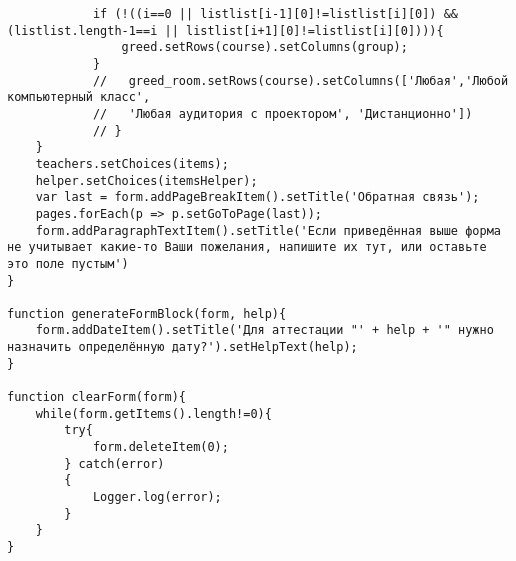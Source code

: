 \begin{lstlisting}
			if (!((i==0 || listlist[i-1][0]!=listlist[i][0]) && (listlist.length-1==i || listlist[i+1][0]!=listlist[i][0]))){
				greed.setRows(course).setColumns(group);
			}
			//   greed_room.setRows(course).setColumns(['Любая','Любой компьютерный класс',
			//   'Любая аудитория с проектором', 'Дистанционно'])
			// }
	}
	teachers.setChoices(items);
	helper.setChoices(itemsHelper);
	var last = form.addPageBreakItem().setTitle('Oбратная связь');
	pages.forEach(p => p.setGoToPage(last));
	form.addParagraphTextItem().setTitle('Если приведённая выше форма не учитывает какие-то Ваши пожелания, напишите их тут, или оставьте это поле пустым')
}

function generateFormBlock(form, help){
	form.addDateItem().setTitle('Для аттестации "' + help + '" нужно назначить определённую дату?').setHelpText(help);
}

function clearForm(form){
	while(form.getItems().length!=0){        
		try{      
			form.deleteItem(0);
		} catch(error)
		{
			Logger.log(error);
		}
	}
}
	
\end{lstlisting}
